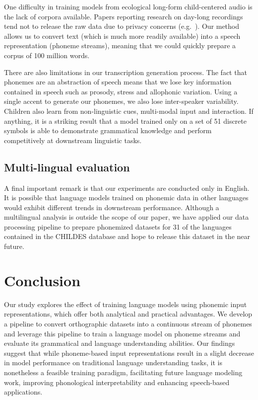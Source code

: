 One difficulty in training models from ecological long-form child-centered audio is the lack of corpora available. Papers reporting research on day-long recordings tend not to release the raw data due to privacy concerns (e.g.\ \citet{bergelson-etal-2023,leon-cristia-2024}).
Our method allows us to convert text (which is much more readily available) into a speech representation (phoneme streams), meaning that we could quickly prepare a corpus of 100 million words. 

There are also limitations in our transcription generation process. The fact that phonemes are an abstraction of speech means that we lose key information contained in speech such as prosody, stress and allophonic variation. Using a single accent to generate our phonemes, we also lose inter-speaker variability. Children also learn from non-linguistic cues, multi-modal input and interaction. If anything, it is a striking result that a model trained only on a set of 51 discrete symbols is able to demonstrate grammatical knowledge and perform competitively at downstream linguistic tasks. 


\subsection{Multi-lingual evaluation}
\label{sec:14-limitations} 

A final important remark is that our experiments are conducted only in English. It is possible that language models trained on phonemic data in other languages would exhibit different trends in downstream performance. Although a multilingual analysis is outside the scope of our paper, we have applied our data processing pipeline to prepare phonemized datasets for 31 of the languages contained in the CHILDES database and hope to release this dataset in the near future.

\section{Conclusion}

Our study explores the effect of training language models using phonemic input representations, which offer both analytical and practical advantages. We develop a pipeline to convert orthographic datasets into a continuous stream of phonemes and leverage this pipeline to train a language model on phoneme streams and evaluate its grammatical and language understanding abilities. Our findings suggest that while phoneme-based input representations result in a slight decrease in model performance on traditional language understanding tasks, it is nonetheless a feasible training paradigm, facilitating future language modeling work, improving phonological interpretability and enhancing speech-based applications.  

